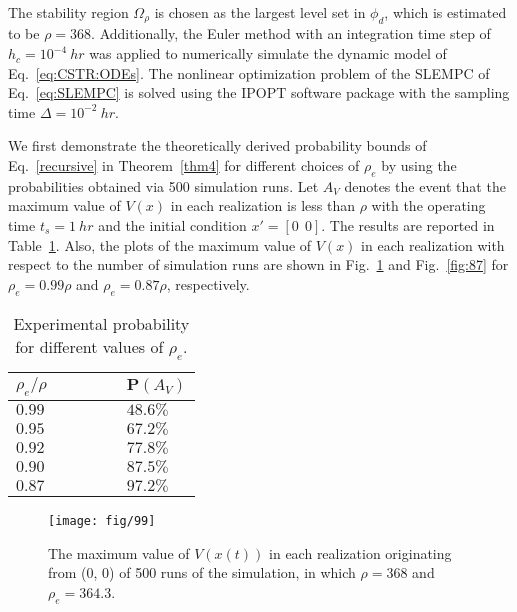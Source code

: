 \documentclass[letterpaper, 10pt, conference]{ieeeconf}
\begin{document}
The stability region $\Omega_{\rho}$ is chosen as the largest level set in $\phi_d$, which is estimated to be $\rho=368$. Additionally, the Euler method with an integration time step of $h_c = 10^{-4} ~hr$ was applied to numerically simulate the dynamic model of Eq.~\ref{eq:CSTR:ODEs}. The nonlinear optimization problem of the SLEMPC of Eq.~\ref{eq:SLEMPC} is solved using the IPOPT software package \cite{wachter2006implementation} with the sampling time $\Delta=10^{-2}~hr$.

We first demonstrate the theoretically derived probability bounds of Eq.~\ref{recursive} in Theorem~\ref{thm4} for different choices of $\rho_{e}$ by using the probabilities obtained via 500 simulation runs. Let $A_V$ denotes the event that the maximum value of $V(x)$ in each realization is less than $\rho$ with the operating time $t_s=1~hr$ and the initial condition $x'=[0 ~~0]$. The results are reported in Table~\ref{table2}. Also, the plots of the maximum value of $V(x)$ in each realization with respect to the number of simulation runs are shown in Fig.~\ref{fig:99} and Fig.~\ref{fig:87} for $\rho_{e}=0.99 \rho$ and $\rho_{e}=0.87 \rho$, respectively.


\begin{table}[h]
	\centering
	\caption{Experimental probability for different values of $\rho_e$.}
	\label{table2}
	\begin{tabular}{ll}
		\toprule
		${\rho_{e}} / {\rho}$ 						& $  \quad   \quad   \quad  \quad \mathbf{P}(A_V) $ 				\\[1ex]
		\toprule
		$0.99$ 						& $ \quad   \quad   \quad  \quad 48.6 \%$  			\\[1ex]
		$0.95$ 	& $ \quad   \quad   \quad  \quad67.2\%$ \\[1ex]
		$0.92$ 				& $\quad   \quad   \quad  \quad77.8\%$ 					\\[1ex]
		$0.90$            &$\quad   \quad   \quad  \quad87.5\%$   \\[1ex] 
		$0.87$            & $\quad   \quad   \quad  \quad97.2\%$   \\[1ex]
		\bottomrule
	\end{tabular}
\end{table}



\begin{figure}[!htbp]
	\centering
	\texttt{[image: fig/99]}
	\vspace{-8pt}
	\caption{The maximum value of ${V(x(t))}$ in each realization originating from (0, 0) of 500 runs of the simulation, in which $\rho=368$ and $\rho_{e}=364.3$.}
	\label{fig:99}
	\vspace{-6pt}
\end{figure}
\end{document}
